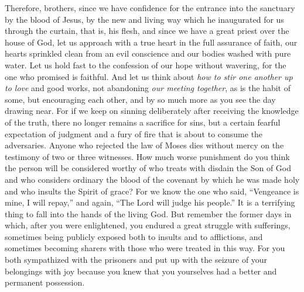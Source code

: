 \begin{biblechapter}
 Therefore, brothers, since we have confidence for the entrance into the sanctuary by the blood of Jesus,
\verse by the new and living way which he inaugurated for us through the curtain, that is, his flesh,
\verse and since we have a great priest over the house of God,
\verse let us approach with a true heart in the full assurance of faith, our hearts sprinkled clean from an evil conscience and our bodies washed with pure water.
\verse Let us hold fast to the confession of our hope without wavering, for the one who promised is faithful.
\verse And let us think about \textit{how to stir one another up to love} and good works,
\verse not abandoning \textit{our meeting together}, as is the habit of some, but encouraging each other, and by so much more as you see the day drawing near.
 For if we keep on sinning deliberately after receiving the knowledge of the truth, there no longer remains a sacrifice for sins,
\verse but a certain fearful expectation of judgment and a fury of fire that is about to consume the adversaries.
\verse Anyone who rejected the law of Moses dies without mercy on the testimony of two or three witnesses.
\verse How much worse punishment do you think the person will be considered worthy of who treats with disdain the Son of God and who considers ordinary the blood of the covenant by which he was made holy and who insults the Spirit of grace?
\verse For we know the one who said, “Vengeance is mine, I will repay,” and again, “The Lord will judge his people.”
\verse It is a terrifying thing to fall into the hands of the living God.
\verse But remember the former days in which, after you were enlightened, you endured a great struggle with sufferings,
\verse sometimes being publicly exposed both to insults and to afflictions, and sometimes becoming sharers with those who were treated in this way.
\verse For you both sympathized with the prisoners and put up with the seizure of your belongings with joy because you knew that you yourselves had a better and permanent possession.

\end{biblechapter}
